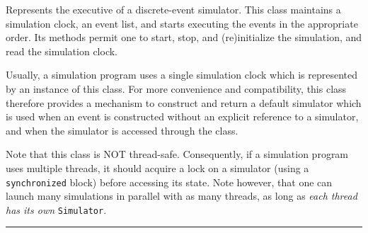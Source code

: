 
Represents the executive of a discrete-event simulator.
This class maintains a simulation
clock, an event list, and starts executing the events 
in the appropriate order.
Its methods permit one to start, stop, and (re)initialize the simulation,
and read the simulation clock.

Usually, a simulation program uses a single simulation clock which is
represented by an instance of this class.
For more convenience and compatibility, this class therefore provides
a mechanism to construct and return a default simulator
which is used when an event is constructed without an explicit reference to a
simulator, and when the simulator is accessed through
the  class.

Note that this class is NOT thread-safe.  Consequently, if a simulation program
uses multiple threads, it should acquire a lock on a simulator (using a
\texttt{synchronized} block) before accessing its state. 
Note however, that one can launch many simulations in parallel with as many
threads, as long as \emph{each thread has its own} \texttt{Simulator}.


\bigskip\hrule

